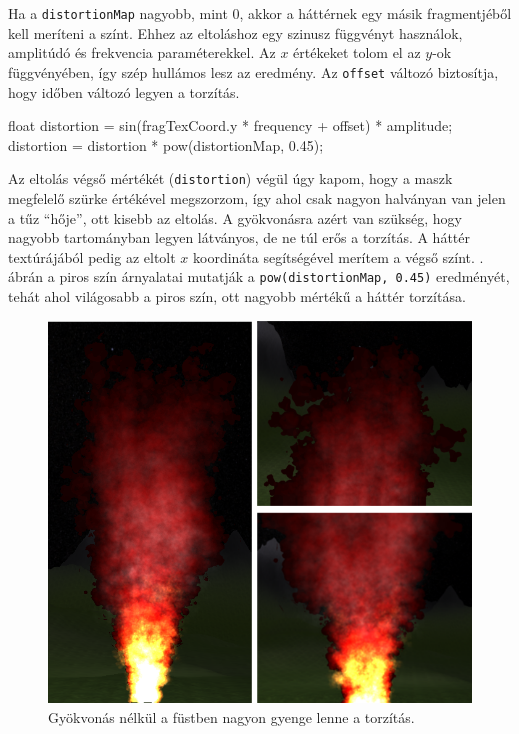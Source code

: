 Ha a \texttt{distortionMap} nagyobb, mint $0$, akkor a háttérnek egy másik fragmentjéből kell meríteni a színt. Ehhez az eltoláshoz egy szinusz függvényt használok, amplitúdó és frekvencia paraméterekkel. Az $x$ értékeket tolom el az $y$-ok függvényében, így szép hullámos lesz az eredmény. Az \texttt{offset} változó biztosítja, hogy időben változó legyen a torzítás.
\begin{cpp}
float distortion = sin(fragTexCoord.y * frequency + offset) * amplitude;
distortion = distortion * pow(distortionMap, 0.45);
\end{cpp}
Az eltolás végső mértékét (\texttt{distortion}) végül úgy kapom, hogy a maszk megfelelő szürke értékével megszorzom, így ahol csak nagyon halványan van jelen a tűz ``hője'', ott kisebb az eltolás. A gyökvonásra azért van szükség, hogy nagyobb tartományban legyen látványos, de ne túl erős a torzítás. A háttér textúrájából pedig az eltolt $x$ koordináta segítségével merítem a végső színt. . ábrán a piros szín árnyalatai mutatják a \texttt{pow(distortionMap, 0.45)} eredményét, tehát ahol világosabb a piros szín, ott nagyobb mértékű a háttér torzítása.

\begin{figure}[h]
 \centering
 \includegraphics[width=\textwidth]{kepek/redDistortion.png}
 \caption{Gyökvonás nélkül a füstben nagyon gyenge lenne a torzítás.}
 \label{fig:redDistortion}
\end{figure}

